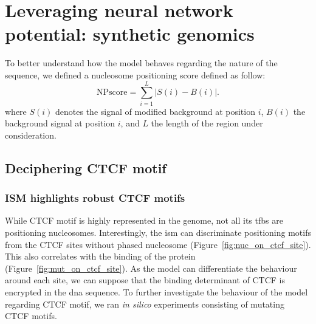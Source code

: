 \documentclass[11pt]{book}
\begin{document}


\chapter{Leveraging neural network potential: synthetic genomics}

\begin{tcolorbox}[title=Nucleosome Positioning score (NPscore), colframe=pink, colback=pink!10!white,coltitle=black, breakable, fonttitle=\bfseries]
To better understand how the model behaves regarding the nature of the sequence, we defined a nucleosome positioning score defined as follow:
\[
    \text{NPscore} = \sum_{i=1}^{L} \left| S(i) - B(i) \right|.
\]
where $S(i)$ denotes the signal of modified background at position $i$, $B(i)$ the background signal at position $i$, and $L$ the length of the region under consideration. 
\end{tcolorbox}

\section{Deciphering CTCF motif}
\subsection{ISM highlights robust CTCF motifs}
While CTCF motif is highly represented in the genome, not all its \gls{tfbs} are positioning nucleosomes. Interestingly, the \gls{ism} can discriminate positioning motifs from the CTCF sites without phased nucleosome (Figure~\ref{fig:nuc_on_ctcf_site}). This also correlates with the binding of the protein (Figure~\ref{fig:mut_on_ctcf_site}). As the model can differentiate the behaviour around each site, we can suppose that the binding determinant of CTCF is encrypted in the \gls{dna} sequence. To further investigate the behaviour of the model regarding CTCF motif, we ran \textit{in silico} experiments consisting of mutating CTCF motifs.
\end{document}
